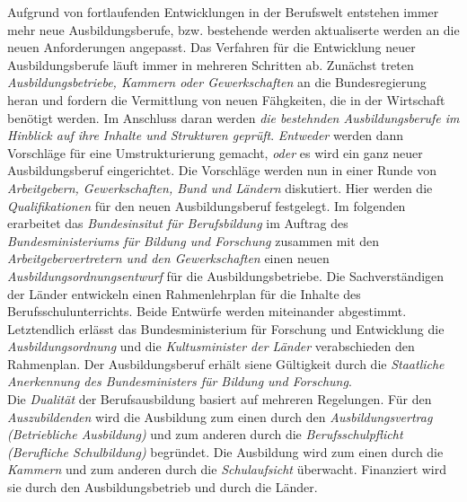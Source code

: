 \documentclass[a4paper, 12pt]{report}
\begin{document}
Aufgrund von fortlaufenden Entwicklungen in der Berufswelt entstehen immer mehr
neue Ausbildungsberufe, bzw. bestehende werden aktualiserte werden an die neuen
Anforderungen angepasst. Das Verfahren für die Entwicklung neuer
Ausbildungsberufe läuft immer in mehreren Schritten ab. Zunächst treten \emph{
Ausbildungsbetriebe, Kammern oder Gewerkschaften} an die Bundesregierung heran
und fordern die Vermittlung von neuen Fähgkeiten, die in der Wirtschaft benötigt
werden. Im Anschluss daran werden \emph{die bestehnden Ausbildungsberufe im
Hinblick auf ihre Inhalte und Strukturen geprüft}. \emph{Entweder} werden dann
Vorschläge für eine Umstrukturierung gemacht, \emph{oder} es wird ein ganz neuer
Ausbildungsberuf eingerichtet. Die Vorschläge werden nun in einer Runde von
\emph{Arbeitgebern, Gewerkschaften, Bund und Ländern} diskutiert. Hier werden
die \emph{Qualifikationen} für den neuen Ausbildungsberuf festgelegt. Im
folgenden erarbeitet das \emph{Bundesinsitut für Berufsbildung} im Auftrag des
\emph{Bundesministeriums für Bildung und Forschung} zusammen mit den
\emph{Arbeitgebervertretern und den Gewerkschaften} einen neuen
\emph{Ausbildungsordnungsentwurf} für die Ausbildungsbetriebe. Die
Sachverständigen der Länder entwickeln einen Rahmenlehrplan für die Inhalte des
Berufsschulunterrichts. Beide Entwürfe werden miteinander abgestimmt.
Letztendlich erlässt das Bundesministerium für Forschung und Entwicklung die
\emph{Ausbildungsordnung} und die \emph{Kultusminister der Länder} verabschieden
den Rahmenplan. Der Ausbildungsberuf erhält siene Gültigkeit durch die
\emph{Staatliche Anerkennung des Bundesministers für Bildung und Forschung}. \\

Die \emph{Dualität} der Berufsausbildung basiert auf mehreren Regelungen. Für
den \emph{Auszubildenden} wird die Ausbildung zum einen durch den
\emph{Ausbildungsvertrag (Betriebliche Ausbildung)} und zum anderen durch die
\emph{Berufsschulpflicht (Berufliche Schulbildung)} begründet. Die Ausbildung
wird zum einen durch die \emph{Kammern} und zum anderen durch die
\emph{Schulaufsicht} überwacht. Finanziert wird sie durch den Ausbildungsbetrieb
und durch die Länder.



\end{document}
